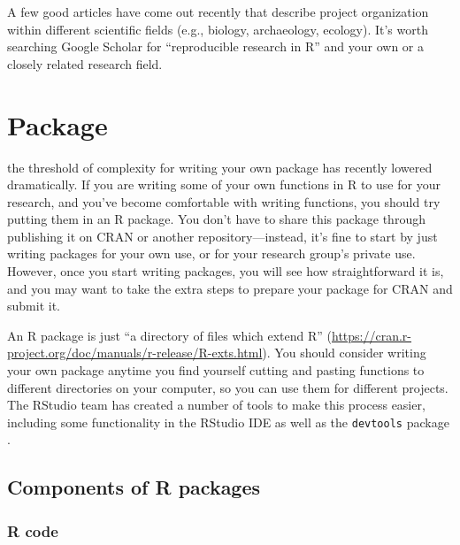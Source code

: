 \documentclass[]{tufte-book}
\begin{document}
A few good articles have come out recently that describe project organization within
different scientific fields (e.g., biology, archaeology, ecology).
It's worth searching Google Scholar for ``reproducible research in R'' and your own
or a closely related research field.

\hypertarget{package}{%
\chapter{Package}\label{package}}

 the threshold of complexity
for writing your own package has recently lowered dramatically. If you are writing
some of your own functions in R to use for your research, and you've become comfortable
with writing functions, you should try putting them in an R package. You don't have
to share this package through publishing it on CRAN or another repository---instead, it's
fine to start by just writing packages for your own use, or for your research group's
private use. However, once you start writing packages, you will see how straightforward
it is, and you may want to take the extra steps to prepare your package for CRAN and
submit it.

An R package is just ``a directory of files which extend R'' (\url{https://cran.r-project.org/doc/manuals/r-release/R-exts.html}).
You should consider writing your own package anytime you find yourself cutting and pasting
functions to different directories on your computer, so you can use them for different
projects. The RStudio team has created a number of tools to make this process easier, including
some functionality in the RStudio IDE as well as the \texttt{devtools} package \citep{R-devtools}.

\hypertarget{components-of-r-packages}{%
\section{Components of R packages}\label{components-of-r-packages}}

\hypertarget{r-code}{%
\subsection{R code}\label{r-code}}
\end{document}
